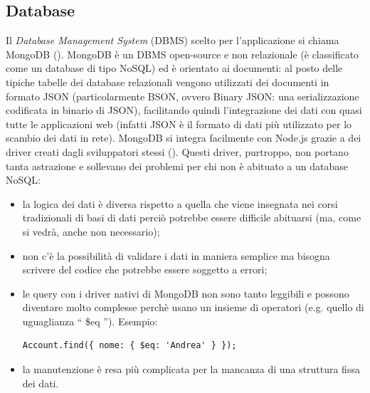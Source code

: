 \documentclass[12pt]{report}
\begin{document}
\subsection{Database}\label{sec:db}
%
Il \emph{Database Management System} (DBMS) scelto per l'applicazione si chiama MongoDB (\cite{mongodb}). MongoDB è un DBMS open-source e non relazionale (è classificato come un database di tipo NoSQL) ed è orientato ai documenti: al posto delle tipiche tabelle dei database relazionali vengono utilizzati dei documenti in formato JSON (particolarmente BSON, ovvero Binary JSON: una serializzazione codificata in binario di JSON), facilitando quindi l'integrazione dei dati con quasi tutte le applicazioni web (infatti JSON è il formato di dati più utilizzato per lo scambio dei dati in rete).
MongoDB si integra facilmente con Node.js grazie a dei driver creati dagli sviluppatori stessi (\cite{mongodb_driver}). Questi driver, purtroppo, non portano tanta astrazione e sollevano dei problemi per chi non è abituato a un database NoSQL: 
\begin{itemize}
	\item la logica dei dati è diversa rispetto a quella che viene insegnata nei corsi tradizionali di basi di dati perciò potrebbe essere difficile abituarsi (ma, come si vedrà, anche non necessario);
	\item non c'è la possibilità di validare i dati in maniera semplice ma bisogna scrivere del codice che potrebbe essere soggetto a errori;
	\item le query con i driver nativi di MongoDB non sono tanto leggibili e possono diventare molto complesse perchè usano un insieme di operatori (e.g. quello di uguaglianza \textquotedblleft{} \$eq \textquotedblright{}). Esempio:
\begin{lstlisting}
Account.find({ nome: { $eq: 'Andrea' } });
\end{lstlisting}

	\item la manutenzione è resa più complicata per la mancanza di una struttura fissa dei dati.
\end{itemize}
\end{document}
